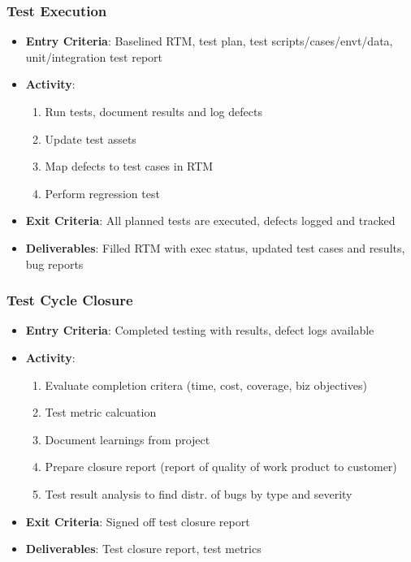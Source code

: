 \documentclass{article}
\begin{document}
\subsubsection{Test Execution}
\begin{itemize}
    \item \textbf{Entry Criteria}: Baselined RTM, test plan, test scripts/cases/envt/data, unit/integration test report
    
    \item \textbf{Activity}:
    \begin{enumerate}
        \item Run tests, document results and log defects
        
        \item Update test assets
        
        \item Map defects to test cases in RTM
        
        \item Perform regression test
    \end{enumerate}
    
    \item \textbf{Exit Criteria}: All planned tests are executed, defects logged and tracked
    
    \item \textbf{Deliverables}: Filled RTM with exec status, updated test cases and results, bug reports
\end{itemize}

\subsubsection{Test Cycle Closure}
\begin{itemize}
    \item \textbf{Entry Criteria}: Completed testing with results, defect logs available
    
    \item \textbf{Activity}: 
    \begin{enumerate}
        \item Evaluate completion critera (time, cost, coverage, biz objectives)
        
        \item Test metric calcuation
        
        \item Document learnings from project
        
        \item Prepare closure report (report of quality of work product to customer)
        
        \item Test result analysis to find distr. of bugs by type and severity
    \end{enumerate}
    
    \item \textbf{Exit Criteria}: Signed off test closure report
    
    \item \textbf{Deliverables}: Test closure report, test metrics
\end{itemize}
\end{document}

